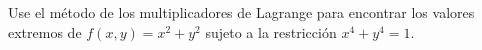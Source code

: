 Use el método de los multiplicadores de Lagrange para encontrar los valores extremos de $f(x, y) = x^2 + y^2$ sujeto a la restricción $x^4 + y^4 = 1$.

